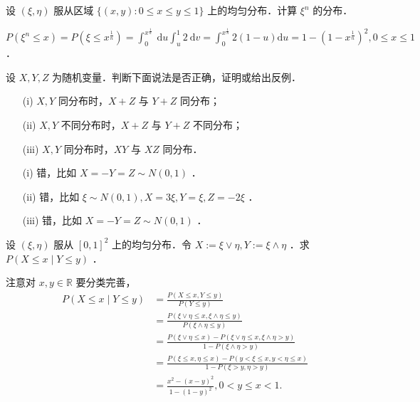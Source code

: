 \begin{exercise}
    设 $(\xi, \eta)$ 服从区域 $\{(x, y): 0 \leqslant x \leqslant y \leqslant 1\}$ 上的均匀分布．计算 $\xi^n$ 的分布．
\end{exercise}
\begin{solution}
    $P\left(\xi^n \leq x\right)=P\left(\xi \leq x^{\frac{1}{n}}\right)=\int_0^{x^{\frac{1}{n}}} \mathrm{~d} u \int_u^1 2 \mathrm{~d} v=\int_0^{x^{\frac{1}{n}}} 2(1-u) \mathrm{d} u=1-\left(1-x^{\frac{1}{n}}\right)^2, 0 \leq x \leq 1$ ．
\end{solution}
\begin{exercise}
    设 $X, Y, Z$ 为随机变量．判断下面说法是否正确，证明或给出反例．
    \begin{enumerate}
        \item[(i)] $X, Y$ 同分布时，$X+Z$ 与 $Y+Z$ 同分布；
        \item[(ii)] $X, Y$ 不同分布时，$X+Z$ 与 $Y+Z$ 不同分布；
        \item[(iii)] $X, Y$ 同分布时，$X Y$ 与 $X Z$ 同分布．
    \end{enumerate}
\end{exercise}
\begin{solution}
    \begin{enumerate}
        \item[(i)] 错，比如 $X=-Y=Z \sim N(0,1)$ ．
        \item[(ii)] 错，比如 $\xi \sim N(0,1), X=3 \xi, Y=\xi, Z=-2 \xi$ ．
        \item[(iii)] 错，比如 $X=-Y=Z \sim N(0,1)$ ．
    \end{enumerate}
\end{solution}
\begin{exercise}

    设 $(\xi, \eta)$ 服从 $[0,1]^2$ 上的均匀分布．令 $X:=\xi \vee \eta, Y:=\xi \wedge \eta$ ．求 $P(X \leq x \mid Y \leq y)$ ．
\end{exercise}
\begin{solution}
    注意对 $x, y \in \mathbb{R}$ 要分类完善，
    $$
        \begin{aligned}
            P(X \leq x \mid Y \leq y) & =\frac{P(X \leq x, Y \leq y)}{P(Y \leq y)}                                                         \\
                                      & =\frac{P(\xi \vee \eta \leq x, \xi \wedge \eta \leq y)}{P(\xi \wedge \eta \leq y)}                 \\
                                      & =\frac{P(\xi \vee \eta \leq x)-P(\xi \vee \eta \leq x, \xi \wedge \eta>y)}{1-P(\xi \wedge \eta>y)} \\
                                      & =\frac{P(\xi \leq x, \eta \leq x)-P(y<\xi \leq x, y<\eta \leq x)}{1-P(\xi>y, \eta>y)}              \\
                                      & =\frac{x^2-(x-y)^2}{1-(1-y)^2}, 0<y \leq x<1 .
        \end{aligned}
    $$
\end{solution}
